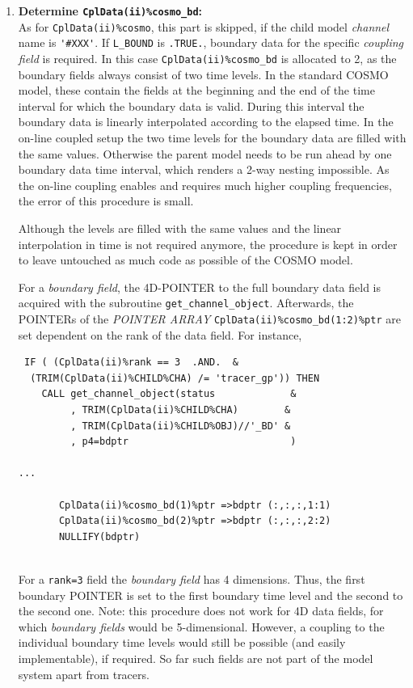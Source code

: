 \documentclass[11pt,twoside]{article}
\begin{document}
\begin{itemize}
\begin{enumerate}
\begin{itemize}
\begin{itemize}
\end{itemize}  %

\end{itemize}  %

\item {\bf Determine {\tt CplData(ii)\%cosmo\_bd}:}\\ %
As for \verb|CplData(ii)%cosmo|, this part is skipped, if the child model
{\it channel} name is \verb|'#XXX'|.
If \verb|L_BOUND| is \verb|.TRUE.|, boundary data for the specific {\it coupling
 field} is required. 
In this case \verb|CplData(ii)%cosmo_bd| is allocated to 2, as the boundary
fields always consist of two time levels. In the standard COSMO model, these
contain the fields at the beginning and the end of the time interval for which
the boundary data is valid. During this interval the boundary data is linearly 
interpolated according to the elapsed time. In the on-line coupled setup
the two time levels for the boundary data are filled with the same values.
Otherwise the parent model needs to be run ahead by one boundary data time 
interval, which renders a 2-way nesting impossible. As the on-line
coupling enables and requires much higher coupling 
frequencies, the error of this procedure is small.

Although the levels are filled with the same values and the linear interpolation
in time is not required anymore, the procedure is kept
 in order to leave untouched as much code as possible of the COSMO model.

For a {\it boundary field}, the 4D-{\footnotesize POINTER} to the full 
boundary data field is acquired  with the subroutine \verb|get_channel_object|.
Afterwards, the {\footnotesize POINTERs} of the {\footnotesize \it
POINTER ARRAY} 
 \verb|CplData(ii)%cosmo_bd(1:2)%ptr| are set dependent on the rank of
the data field. For instance,
\begin{verbatim}
 IF ( (CplData(ii)%rank == 3  .AND.  &
  (TRIM(CplData(ii)%CHILD%CHA) /= 'tracer_gp')) THEN
    CALL get_channel_object(status             & 
         , TRIM(CplData(ii)%CHILD%CHA)        &
         , TRIM(CplData(ii)%CHILD%OBJ)//'_BD' &
         , p4=bdptr                            )
         
...

       CplData(ii)%cosmo_bd(1)%ptr =>bdptr (:,:,:,1:1)
       CplData(ii)%cosmo_bd(2)%ptr =>bdptr (:,:,:,2:2)
       NULLIFY(bdptr)
 
\end{verbatim}
For a \verb|rank=3| field the {\it boundary field} has 4 dimensions.
Thus, the first boundary {\footnotesize POINTER} is set to the first boundary 
time level and the second to the second one. 
Note: this procedure does not work for 4D data fields, for  which 
{\it boundary fields}
 would be 5-dimensional. However, a coupling to the individual boundary time 
levels would still be possible (and easily implementable), if required. 
So far such fields are
 not part of the model system apart from tracers.



\end{enumerate}
\end{itemize}
\end{document}
